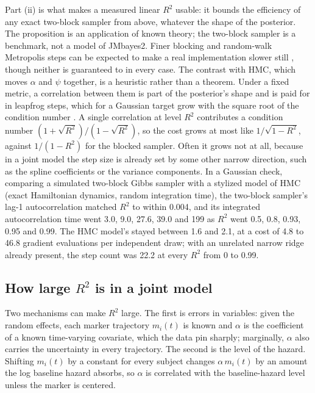 Part (ii) is what makes a measured linear $R^2$ usable: it bounds the
efficiency of any exact two-block sampler from above, whatever the shape
of the posterior. The proposition is an application of known theory; the
two-block sampler is a benchmark, not a model of JMbayes2. Finer blocking
and random-walk Metropolis steps can be expected to make a real
implementation slower still \citep{liu1994,roberts1997}, though neither is
guaranteed to in every case. The contrast with HMC, which moves $\alpha$
and $\psi$ together, is a heuristic rather than a theorem. Under a fixed
metric, a correlation between them is part of the posterior's shape and is
paid for in leapfrog steps, which for a Gaussian target grow with the
square root of the condition number \citep{neal2011}. A single correlation at level $R^2$
contributes a condition number $(1 + \sqrt{R^2})/(1 - \sqrt{R^2})$, so the
cost grows at most like $1/\sqrt{1 - R^2}$, against $1/(1 - R^2)$ for the
blocked sampler.
Often it grows not at all, because in a joint model the step size is
already set by some other narrow direction, such as the spline
coefficients or the variance components. In a Gaussian check, comparing a
simulated two-block Gibbs sampler with a stylized model of HMC (exact
Hamiltonian dynamics, random integration time), the two-block sampler's
lag-1 autocorrelation
matched $R^2$ to within 0.004, and its integrated autocorrelation time
went 3.0, 9.0, 27.6, 39.0 and 199 as $R^2$ went 0.5, 0.8, 0.93, 0.95 and
0.99. The HMC model's stayed between 1.6 and 2.1, at a cost of 4.8 to 46.8
gradient evaluations per independent draw; with an unrelated narrow ridge
already present, the step count was 22.2 at every $R^2$ from 0 to 0.99.

\subsection{How large $R^2$ is in a joint model}

Two mechanisms can make $R^2$ large. The first is errors in variables: given the
random effects, each marker trajectory $m_i(t)$ is known and $\alpha$ is
the coefficient of a known time-varying covariate, which the data pin
sharply; marginally, $\alpha$ also carries the uncertainty in every
trajectory. The second is the level of the hazard. Shifting $m_i(t)$ by a
constant for every subject changes $\alpha\, m_i(t)$ by an amount the log
baseline hazard absorbs, so $\alpha$ is correlated with the baseline-hazard
level unless the marker is centered.


